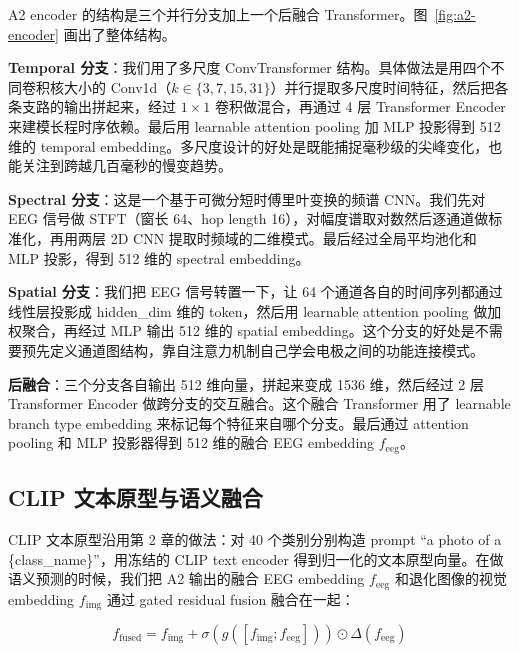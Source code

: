 A2 encoder 的结构是三个并行分支加上一个后融合 Transformer。图~\ref{fig:a2-encoder} 画出了整体结构。


\textbf{Temporal 分支}：我们用了多尺度 ConvTransformer 结构。具体做法是用四个不同卷积核大小的 Conv1d（$k \in \{3, 7, 15, 31\}$）并行提取多尺度时间特征，然后把各条支路的输出拼起来，经过 $1\times1$ 卷积做混合，再通过 4 层 Transformer Encoder 来建模长程时序依赖。最后用 learnable attention pooling 加 MLP 投影得到 512 维的 temporal embedding。多尺度设计的好处是既能捕捉毫秒级的尖峰变化，也能关注到跨越几百毫秒的慢变趋势。

\textbf{Spectral 分支}：这是一个基于可微分短时傅里叶变换的频谱 CNN。我们先对 EEG 信号做 STFT（窗长 64、hop length 16），对幅度谱取对数然后逐通道做标准化，再用两层 2D CNN 提取时频域的二维模式。最后经过全局平均池化和 MLP 投影，得到 512 维的 spectral embedding。

\textbf{Spatial 分支}：我们把 EEG 信号转置一下，让 64 个通道各自的时间序列都通过线性层投影成 hidden\_dim 维的 token，然后用 learnable attention pooling 做加权聚合，再经过 MLP 输出 512 维的 spatial embedding。这个分支的好处是不需要预先定义通道图结构，靠自注意力机制自己学会电极之间的功能连接模式。

\textbf{后融合}：三个分支各自输出 512 维向量，拼起来变成 1536 维，然后经过 2 层 Transformer Encoder 做跨分支的交互融合。这个融合 Transformer 用了 learnable branch type embedding 来标记每个特征来自哪个分支。最后通过 attention pooling 和 MLP 投影器得到 512 维的融合 EEG embedding $f_{\mathrm{eeg}}$。

\subsection{CLIP 文本原型与语义融合}

CLIP 文本原型沿用第 2 章的做法：对 40 个类别分别构造 prompt ``a photo of a \{class\_name\}''，用冻结的 CLIP text encoder 得到归一化的文本原型向量。在做语义预测的时候，我们把 A2 输出的融合 EEG embedding $f_{\mathrm{eeg}}$ 和退化图像的视觉 embedding $f_{\mathrm{img}}$ 通过 gated residual fusion 融合在一起：

\begin{equation}
  f_{\mathrm{fused}} = f_{\mathrm{img}} + \sigma\left(g\left([f_{\mathrm{img}}; f_{\mathrm{eeg}}]\right)\right) \odot \Delta(f_{\mathrm{eeg}})
\end{equation}

